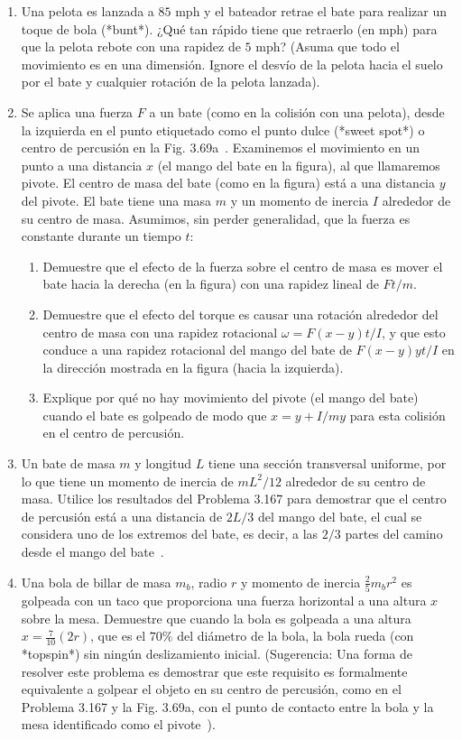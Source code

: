 \documentclass[12pt]{book}
\begin{document}
\begin{enumerate}
\item[3.166] Una pelota es lanzada a $85\text{ mph}$ y el bateador retrae el bate para realizar un toque de bola (*bunt*). ¿Qué tan rápido tiene que retraerlo (en $\text{mph}$) para que la pelota rebote con una rapidez de $5\text{ mph}$? (Asuma que todo el movimiento es en una dimensión. Ignore el desvío de la pelota hacia el suelo por el bate y cualquier rotación de la pelota lanzada).

\item[3.167] Se aplica una fuerza $F$ a un bate (como en la colisión con una pelota), desde la izquierda en el punto etiquetado como el punto dulce (*sweet spot*) o centro de percusión en la Fig. 3.69a~\cite{ref36}. Examinemos el movimiento en un punto a una distancia $x$ (el mango del bate en la figura), al que llamaremos pivote. El centro de masa del bate (como en la figura) está a una distancia $y$ del pivote. El bate tiene una masa $m$ y un momento de inercia $I$ alrededor de su centro de masa. Asumimos, sin perder generalidad, que la fuerza es constante durante un tiempo $t$:
\begin{enumerate}
\item[(a)] Demuestre que el efecto de la fuerza sobre el centro de masa es mover el bate hacia la derecha (en la figura) con una rapidez lineal de $F t/m$.
\item[(b)] Demuestre que el efecto del torque es causar una rotación alrededor del centro de masa con una rapidez rotacional $\omega = F(x - y)t/I$, y que esto conduce a una rapidez rotacional del mango del bate de $F(x - y)yt/I$ en la dirección mostrada en la figura (hacia la izquierda).
\item[(c)] Explique por qué no hay movimiento del pivote (el mango del bate) cuando el bate es golpeado de modo que $x = y + I/my$ para esta colisión en el centro de percusión.
\end{enumerate}

\item[3.168] Un bate de masa $m$ y longitud $L$ tiene una sección transversal uniforme, por lo que tiene un momento de inercia de $mL^2/12$ alrededor de su centro de masa. Utilice los resultados del Problema 3.167 para demostrar que el centro de percusión está a una distancia de $2L/3$ del mango del bate, el cual se considera uno de los extremos del bate, es decir, a las $2/3$ partes del camino desde el mango del bate~\cite{ref36}.

\item[3.169] Una bola de billar de masa $m_b$, radio $r$ y momento de inercia $\frac{2}{5} m_b r^2$ es golpeada con un taco que proporciona una fuerza horizontal a una altura $x$ sobre la mesa. Demuestre que cuando la bola es golpeada a una altura $x = \frac{7}{10}(2r)$, que es el $70\%$ del diámetro de la bola, la bola rueda (con *topspin*) sin ningún deslizamiento inicial. (Sugerencia: Una forma de resolver este problema es demostrar que este requisito es formalmente equivalente a golpear el objeto en su centro de percusión, como en el Problema 3.167 y la Fig. 3.69a, con el punto de contacto entre la bola y la mesa identificado como el pivote~\cite{ref36}).


\end{enumerate}
\end{document}
